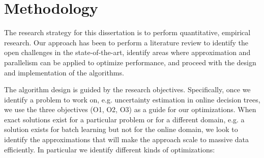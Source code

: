 \section{Methodology}

The research strategy for this dissertation is to perform quantitative, empirical research.
Our approach has been to perform a literature review to identify the open challenges in the
state-of-the-art, identify areas where approximation and parallelism can be applied to
optimize performance, and proceed with the design and implementation of the algorithms.

The algorithm design is guided by the research objectives. Specifically, once we identify a problem
to work on, e.g. uncertainty estimation in online decision trees, we use the three objectives
(O1, O2, O3) as a guide for our optimizations. When exact solutions exist for a particular problem
or for a different domain, e.g. a solution exists for batch learning but not for the online
domain, we look to identify the approximations that will make the approach scale to massive
data efficiently. In particular we identify different kinds of optimizations:

